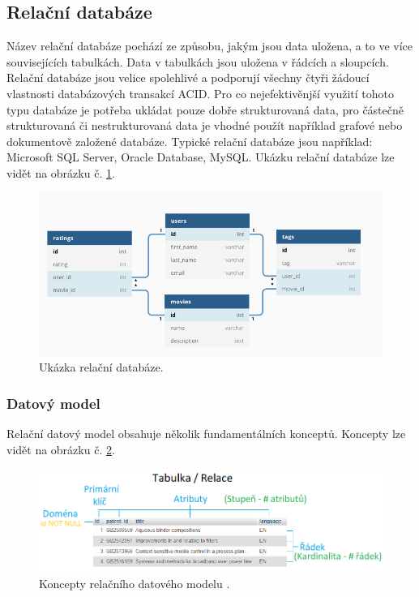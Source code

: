 \subsection{Relační databáze}
Název relační databáze pochází ze způsobu, jakým jsou data uložena, a to ve více souvisejících tabulkách. Data v tabulkách jsou uložena v řádcích a sloupcích. Relační databáze jsou velice spolehlivé a podporují všechny čtyři žádoucí vlastnosti databázových transakcí \gls{ACID}. Pro co nejefektivěnjší využití tohoto typu databáze je potřeba ukládat pouze dobře strukturovaná data, pro částečně strukturovaná či nestrukturovaná data je vhodné použít například grafové nebo dokumentově založené databáze. Typické relační databáze jsou například: Microsoft SQL Server, Oracle Database, MySQL. Ukázku relační databáze lze vidět na obrázku č. \ref{fig:db_img_relational}.
	\begin{figure}[H]
	\centering
	\includegraphics[width=14cm]{img/databaze/relational_db}
	\caption{Ukázka relační databáze.}
	\label{fig:db_img_relational}
	\end{figure}
\subsubsection{Datový model}
Relační datový model obsahuje několik fundamentálních konceptů. Koncepty lze vidět na obrázku č. \ref{fig:model_relational}.
\begin{figure}[H]
\centering
\includegraphics[width=16cm]{img/databaze/data_model_relational}
\caption{Koncepty relačního datového modelu \cite{data_model_oo}.}
\label{fig:model_relational}
\end{figure}

